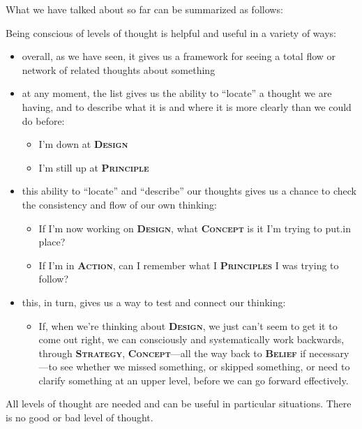 \documentclass[a5paper]{article}
\begin{document}
What we have talked about so far can be summarized as follows:



Being conscious of levels of thought is helpful and useful in a variety of ways:
\begin{itemize}
  \item overall, as we have seen, it gives us a framework for seeing a total flow or network of related thoughts about something
  \item at any moment, the list gives us the ability to ``locate'' a thought we are having, and to describe what it is and where it is more clearly than we could do before:
    \begin{itemize}
      \item I'm down at \textbf{\scshape Design}
      \item I'm still up at \textbf{\scshape Principle}
    \end{itemize}
  \item this ability to ``locate'' and ``describe'' our thoughts gives us a chance to check the consistency and flow of our own thinking:
    \begin{itemize}
      \item If I'm now working on \textbf{\scshape Design}, what \textbf{\scshape Concept} is it I'm trying to put.in place?
      \item If I'm in \textbf{\scshape Action}, can I remember what I \textbf{\scshape Principles} I was trying to follow?
    \end{itemize}
  \item this, in turn, gives us a way to test and connect our thinking:
    \begin{itemize}
      \item If, when we're thinking about \textbf{\scshape Design}, we just can't seem to get it to come out right, we can consciously and systematically work backwards, through \textbf{\scshape Strategy}, \textbf{\scshape Concept}---all the way back to \textbf{\scshape Belief} if necessary---to see whether we missed something, or skipped something, or need to clarify something at an upper level, before we can go forward effectively.
    \end{itemize}
\end{itemize}
All levels of thought are needed and can be useful in particular situations.
There is no good or bad level of thought.
\end{document}
